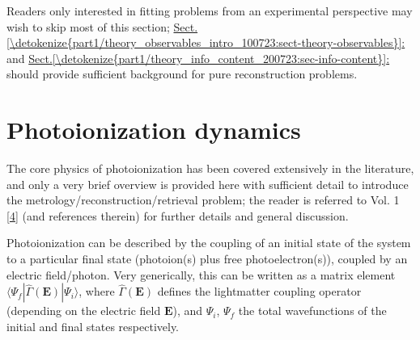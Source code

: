 \documentclass[letterpaper,table,10pt,english]{jupyterBook}
\begin{document}
\sphinxAtStartPar
Readers only interested in fitting problems from an experimental perspective may wish to skip most of this section; \hyperref[\detokenize{part1/theory_observables_intro_100723:sect-theory-observables}]{Sect.\@ \ref{\detokenize{part1/theory_observables_intro_100723:sect-theory-observables}}:} and \hyperref[\detokenize{part1/theory_info_content_200723:sec-info-content}]{Sect.\@ \ref{\detokenize{part1/theory_info_content_200723:sec-info-content}}:} should provide sufficient background for pure reconstruction problems.

\sphinxstepscope


\section{Photoionization dynamics}
\label{\detokenize{part1/theory_photoionization_dynamics_140723:photoionization-dynamics}}\label{\detokenize{part1/theory_photoionization_dynamics_140723:sec-dynamics-intro}}\label{\detokenize{part1/theory_photoionization_dynamics_140723::doc}}
\sphinxAtStartPar
The core physics of photoionization has been covered extensively in the literature, and only a very brief overview is provided here with sufficient detail to introduce the metrology/reconstruction/retrieval problem; the reader is referred to  Vol. 1 {[}\hyperlink{cite.backmatter/bibliography:id676}{4}{]} (and references therein) for further details and general discussion.

\sphinxAtStartPar
Photoionization can be described by the coupling of an initial state of the system to a particular final state (photoion(s) plus free photoelectron(s)), coupled by an electric field/photon. Very generically, this can be written as a matrix element \(\langle\Psi_f|\hat{\Gamma}(\boldsymbol{\mathbf{E}})|\Psi_i\rangle\), where \(\hat{\Gamma}(\boldsymbol{\mathbf{E}})\) defines the light\sphinxhyphen{}matter coupling operator (depending on the electric field \(\boldsymbol{\mathbf{E}}\)), and \(\Psi_i\), \(\Psi_f\) the total wavefunctions of the initial and final states respectively.
\end{document}

